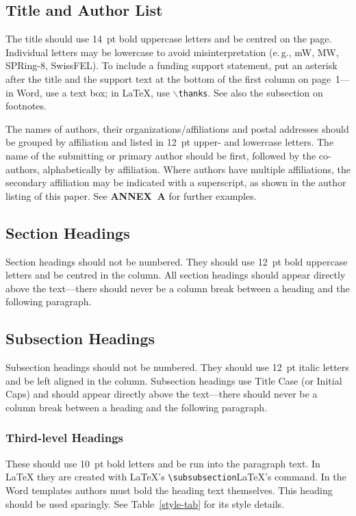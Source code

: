 \documentclass[a4paper,
              ]{jacow}
\newcommand\SEC[1]{\textbf{\uppercase{#1}}}
\begin{document}
\subsection{Title and Author List}

The title should use \SI{14}{pt} bold uppercase letters and be centred on the page.
Individual letters may be lowercase to avoid misinterpretation (e.\,g., mW, MW, SPRing-8, SwissFEL).
To include a funding support statement, put an asterisk after the title and
the support text at the bottom of the first column on page~1---in Word,
use a text box; in \LaTeX, use $\backslash$\texttt{thanks}. See also the
subsection on footnotes.

The names of authors, their organizations/affiliations and
postal addresses should be grouped by affiliation and
listed in \SI{12}{pt} upper- and lowercase letters. The name of
the submitting or primary author should be first, followed
by the co-authors, alphabetically by affiliation. Where
authors have multiple affiliations, the secondary affiliation
may be indicated with a superscript, as shown in the
author listing of this paper. See \SEC{Annex~A} for further examples.

\subsection{Section Headings}

Section headings should not be numbered. They should
use  \SI{12}{pt}  bold  uppercase  letters  and  be  centred  in  the
column. All section headings should appear directly above
the text---there should never be a column break between a heading and the
following paragraph.

\subsection{Subsection Headings}

Subsection  headings  should  not  be  numbered.
They should use \SI{12}{pt} italic letters and be left aligned in the column.
Subsection headings use Title Case (or Initial Caps)
and should appear directly above the text---there should never be a column break
between a heading and the following paragraph.

\subsubsection{Third-level Headings} These should use \SI{10}{pt} bold
letters and be run into the paragraph text. In \LaTeX{} they are
created with \LaTeX's \verb|\subsubsection|LaTeX’s command.
In the Word templates authors must bold the heading text themselves.
This heading should be used sparingly. See Table~\ref{style-tab}
for its style details.
\end{document}
